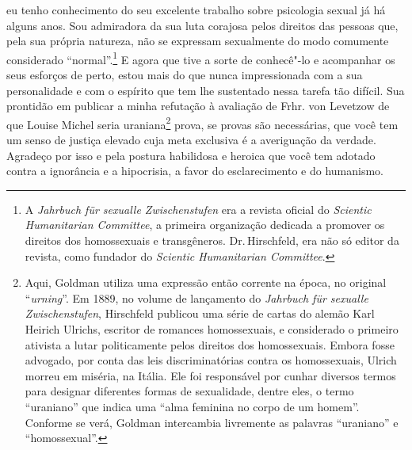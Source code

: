 \noindent eu tenho conhecimento do seu excelente trabalho sobre psicologia sexual
já há alguns anos. Sou admiradora da sua luta corajosa pelos direitos
das pessoas que, pela sua própria natureza, não se expressam sexualmente
do modo comumente considerado ``normal''.\footnote{A \emph{Jahrbuch für
  sexualle Zwischenstufen} era a revista oficial do \emph{Scientic
  Humanitarian Committee}, a primeira organização dedicada a promover os
  direitos dos homossexuais e transgêneros. Dr.\,Hirschfeld, era não só
  editor da revista, como fundador do \emph{Scientic Humanitarian
  Committee}.} E agora que tive a sorte de conhecê"-lo e acompanhar os
seus esforços de perto, estou mais do que nunca impressionada com a sua
personalidade e com o espírito que tem lhe sustentado nessa tarefa tão
difícil. Sua prontidão em publicar a minha refutação à avaliação de
Frhr. von Levetzow de que Louise Michel seria uraniana\footnote{Aqui,
  Goldman utiliza uma expressão então corrente na época, no original
  ``\emph{urning}''. Em 1889, no volume de lançamento do \emph{Jahrbuch
  für sexualle Zwischenstufen}, Hirschfeld publicou uma série de cartas
  do alemão Karl Heirich Ulrichs, escritor de romances homossexuais, e
  considerado o primeiro ativista a lutar politicamente pelos direitos
  dos homossexuais. Embora fosse advogado, por conta das leis
  discriminatórias contra os homossexuais, Ulrich morreu em miséria, na
  Itália. Ele foi responsável por cunhar diversos termos para designar
  diferentes formas de sexualidade, dentre eles, o termo ``uraniano''
  que indica uma ``alma feminina no corpo de um homem''. Conforme se
  verá, Goldman intercambia livremente as palavras ``uraniano'' e
  ``homossexual''.} prova, se provas são necessárias, que você tem um
senso de justiça elevado cuja meta exclusiva é a averiguação da verdade.
Agradeço por isso e pela postura habilidosa e heroica que você tem
adotado contra a ignorância e a hipocrisia, a favor do esclarecimento e
do humanismo.

